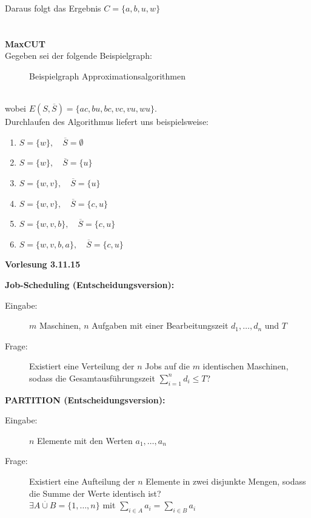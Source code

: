 \documentclass{article} %
\begin{document}
Daraus folgt das Ergebnis $C = \{a,b,u,w\}$\\
\\
\\
\textbf{MaxCUT}\\
Gegeben sei der folgende Beispielgraph:
\begin{figure}[!htp]
	\centering
	\caption{Beispielgraph Approximationsalgorithmen}
\end{figure}\\
wobei $E(S, \overline{S}) = \{ac, bu, bc, vc, vu, wu\}$.\\
Durchlaufen des Algorithmus liefert uns beispielsweise:
\begin{enumerate}[label=\textbf{\arabic*. Schritt}:, leftmargin=8em]
	\item $S = \{w\}, \quad \overline{S} = \emptyset$
	\item $S = \{w\}, \quad \overline{S} = \{u\}$
	\item $S = \{w, v\}, \quad \overline{S} = \{u\}$
	\item $S = \{w, v\}, \quad \overline{S} = \{c, u\}$
	\item $S = \{w, v, b\}, \quad \overline{S} = \{c, u\}$
	\item $S = \{w, v, b, a\}, \quad \overline{S} = \{c, u\}$
\end{enumerate}

{\Large\textbf{Vorlesung 3.11.15}}\\
\begin{framed}
	\textbf{Job-Scheduling (Entscheidungsversion):}
	\begin{description}
		\item  [Eingabe:] $m$ Maschinen, $n$ Aufgaben mit einer Bearbeitungszeit $d_1, \ldots, d_n$ und $T$
		\item [Frage:] Existiert eine Verteilung der $n$ Jobs auf die $m$ identischen Maschinen, sodass die Gesamtausführungszeit $\sum_{i=1}^{n} d_i \leq T$?
	\end{description}
\end{framed}
\begin{framed}
	\textbf{PARTITION (Entscheidungsversion):}
	\begin{description}
		\item  [Eingabe:] $n$ Elemente mit den Werten $a_1, \ldots, a_n$
		\item [Frage:] Existiert eine Aufteilung der $n$ Elemente in zwei disjunkte Mengen, sodass die Summe der Werte identisch ist? \\
		$\exists A \stackrel{\cdot}{\cup} B = \{1, \ldots, n\}$ mit $\sum_{i \in A} a_i = \sum_{i \in B} a_i$
	\end{description}
\end{framed}
\end{document}
